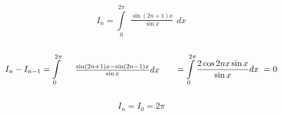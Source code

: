 \documentclass{article}
\begin{document}
$$
I_n=\int\limits_0^{2\pi}{\begin{array}{c}
	\frac{\sin \left( 2n+1 \right) x}{\sin x}\\
\end{array}dx}
$$
\\
$$
I_n-I_{n-1}=\int\limits_0^{2\pi}{\begin{array}{c}
	\begin{array}{c}
	\begin{array}{c}
	\frac{\sin \left( 2n+1 \right) x-\sin \left( 2n-1 \right) x}{\sin x}dx\\
\end{array}\\
\end{array}\\
\end{array}}
\\
\,\,           =\int\limits_0^{2\pi}{\frac{2\cos 2nx\sin x}{\sin x}dx}
\\
\,\,           =0
$$
\\
$$
I_n=I_0=2\pi
$$
\end{document}
